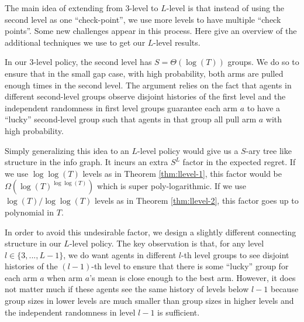 The main idea of extending from 3-level to $L$-level is that instead of using the second level as one ``check-point'', we use more levels to have multiple ``check points''.  Some new challenges appear in this process. Here give an overview of the additional techniques we use to get our $L$-level results. 

 In our 3-level policy, the second level has $S = \Theta(\log(T))$ groups. We do so to ensure that in the small gap case, with high probability, both arms are pulled enough times in the second level. The argument relies on the fact that agents in different second-level groups observe disjoint histories of the first level and the independent randomness in first level groups guarantee each arm $a$ to have a ``lucky'' second-level group such that agents in that group all pull arm $a$ with high probability. 

Simply generalizing this idea to an $L$-level policy would give us a $S$-ary tree like structure in the info graph. It incurs an extra $S^L$ factor in the expected regret. If we use $\log\log(T)$ levels as in Theorem \ref{thm:llevel-1}, this factor would be $\Omega\left(\log(T)^{\log\log(T)}\right)$ which is super poly-logarithmic. If we use $\log(T)/\log\log(T)$ levels as in Theorem \ref{thm:llevel-2}, this factor goes up to polynomial in $T$. 

In order to avoid this undesirable factor, we design a slightly different connecting structure in our $L$-level policy. The key observation is that, for any level $l \in \{3,...,L-1\}$, we do want agents in different $l$-th level groups to see disjoint histories of the $(l-1)$-th level to ensure that there is some ``lucky'' group for each arm $a$ when arm $a$'s mean is close enough to the best arm. However, it does not matter much if these agents see the same history of levels below $l-1$ because group sizes in lower levels are much smaller than group sizes in higher levels and the independent randomness in level $l-1$ is sufficient.

